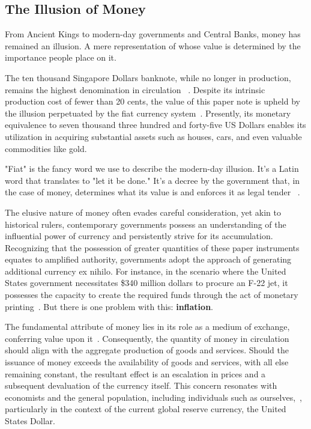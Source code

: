 \subsection{The Illusion of Money}
From Ancient Kings to modern-day governments and Central Banks, money has remained an illusion. A mere representation of
whose value is determined by the importance people place on it.

The ten thousand Singapore Dollars banknote, while no longer in production, remains the highest denomination in
circulation ~\cite{goodhart1998}. Despite its intrinsic production cost of fewer than 20 cents, the value of this paper
note is upheld by the illusion perpetuated by the fiat currency system~\cite{gupta2019}. Presently, its monetary
equivalence to seven thousand three hundred and forty-five US Dollars enables its utilization in acquiring substantial
assets such as houses, cars, and even valuable commodities like gold.

"Fiat" is the fancy word we use to describe the modern-day illusion. It's a Latin word that translates to "let it be
done." It's a decree by the government that, in the case of money, determines what its value is and enforces it as legal
tender ~\cite{reinhart2018, friedman2000}.

The elusive nature of money often evades careful consideration, yet akin to historical rulers, contemporary governments
possess an understanding of the influential power of currency and persistently strive for its accumulation. Recognizing
that the possession of greater quantities of these paper instruments equates to amplified authority, governments adopt
the approach of generating additional currency ex nihilo. For instance, in the scenario where the United States
government necessitates \$340 million dollars to procure an F-22 jet, it possesses the capacity to create the required
funds through the act of monetary printing~\cite{graeber2011, mankiw2014}. But there is one problem with this:
\textbf{inflation}.

The fundamental attribute of money lies in its role as a medium of exchange, conferring value upon it~\cite{mankiw2014}.
Consequently, the quantity of money in circulation should align with the aggregate production of goods and services.
Should the issuance of money exceeds the availability of goods and services, with all else remaining constant, the
resultant effect is an escalation in prices and a subsequent devaluation of the currency itself. This concern resonates
with economists and the general population, including individuals such as ourselves,~\cite{blinder2010}, particularly in
the context of the current global reserve currency, the United States Dollar.

